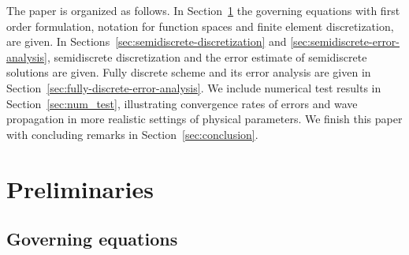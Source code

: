 \documentclass[10pt,letterpaper]{amsart}
\theoremstyle{plain} %
\theoremstyle{remark} %
\begin{document}
The paper is organized as follows. In Section~\ref{sec:preliminaries} the governing equations with first order formulation, notation for function spaces and finite element discretization, are given. In Sections~\ref{sec:semidiscrete-discretization} and \ref{sec:semidiscrete-error-analysis}, semidiscrete discretization and the error estimate of semidiscrete solutions are given. Fully discrete scheme and its error analysis are given in Section~\ref{sec:fully-discrete-error-analysis}. We include numerical test results in Section~\ref{sec:num_test}, illustrating convergence rates of errors and wave propagation in more realistic settings of physical parameters. We finish this paper with concluding remarks in Section~\ref{sec:conclusion}. 


\section{Preliminaries}
\label{sec:preliminaries}

\subsection{Governing equations}\label{ss:governing-equations}
\end{document}
